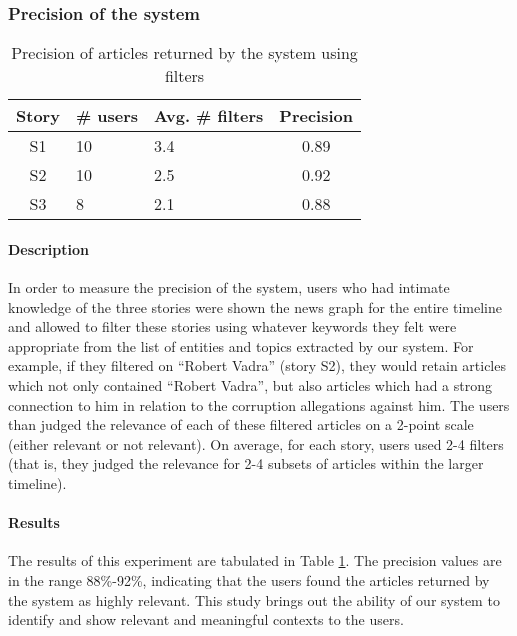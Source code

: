 \subsubsection{Precision of the system}
\begin{table}
\begin{center}
\small
\begin{tabular}{|c|p{1.25cm}|p{1.25cm}|c|}
\hline
{\bf Story} & {\bf \# users} & {\bf Avg. \# filters} & {\bf Precision}\\
\hline
S1 & 10 & 3.4 & 0.89\\
S2 & 10 & 2.5 & 0.92\\
S3 & 8 & 2.1 & 0.88\\
\hline
\end{tabular}
\end{center}
\caption{Precision of articles returned by the system using filters}
\label{tab:prec}
\end{table}

\normalsize

\paragraph*{Description} In order to measure the precision of the system, users who had intimate knowledge of the three stories were shown the news graph for the entire timeline and allowed to filter these stories using whatever keywords they felt were appropriate from the list of entities and topics extracted by our system. For example, if they filtered on ``Robert Vadra'' (story S2), they would retain articles which not only contained ``Robert Vadra'', but also articles which had a strong connection to him in relation to the corruption allegations against him. The users than judged the relevance of each of these filtered articles on a 2-point scale (either relevant or not relevant). On average, for each story, users used 2-4 filters (that is, they judged the relevance for 2-4 subsets of articles within the larger timeline).

\paragraph*{Results} The results of this experiment are tabulated in Table \ref{tab:prec}. The precision values are in the range 88\%-92\%, indicating that the users found the articles returned by the system as highly relevant. This study brings out the ability of our system to identify and show relevant and meaningful contexts to the users.


